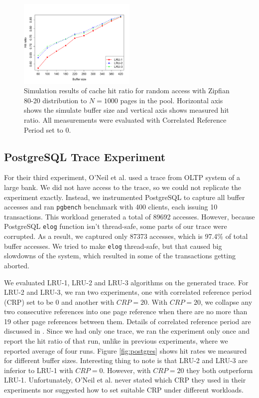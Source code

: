 \begin{figure}[t!]
    \centering
	\includegraphics[width=0.5\textwidth]{./figures/zipfian.pdf}
	\caption{Simulation results of cache hit ratio for random access with Zipfian 80-20 distribution to $N = 1000$ pages in the pool. Horizontal axis shows the simulate buffer size and vertical axis shows measured hit ratio. All measurements were evaluated with Correlated Reference Period set to 0.}
	\label{fig:zipfian}
\end{figure}


\subsection{PostgreSQL Trace Experiment}

For their third experiment, O'Neil et al. \cite{lruk} used a trace from OLTP system of a large bank. We did not have access to the trace, so we could not replicate the experiment exactly. Instead, we instrumented PostgreSQL to capture all buffer accesses and ran \texttt{pgbench} benchmark with 400 clients, each issuing 10 transactions. This workload generated a total of 89692 accesses. However, because PostgreSQL \texttt{elog} function isn't thread-safe, some parts of our trace were corrupted. As a result, we captured only 87373 accesses, which is 97.4\% of total buffer accesses. We tried to make \texttt{elog} thread-safe, but that caused big slowdowns of the system, which resulted in some of the transactions getting aborted.

We evaluated LRU-1, LRU-2 and LRU-3 algorithms on the generated trace. For LRU-2 and LRU-3, we ran two experiments, one with correlated reference period (CRP) set to be 0 and another with $CRP = 20$. With $CRP = 20$, we collapse any two consecutive references into one page reference when there are no more than 19 other page references between them. Details of correlated reference period are discussed in \cite{lruk}. Since we had only one trace, we ran the experiment only once and report the hit ratio of that run, unlike in previous experiments, where we reported average of four runs. Figure \ref{fig:postgres} shows hit rates we measured for different buffer sizes. Interesting thing to note is that LRU-2 and LRU-3 are inferior to LRU-1 with $CRP = 0$. However, with $CRP = 20$ they both outperform LRU-1. Unfortunately, O'Neil et al. \cite{lruk} never stated which CRP they used in their experiments nor suggested how to set suitable CRP under different workloads.

